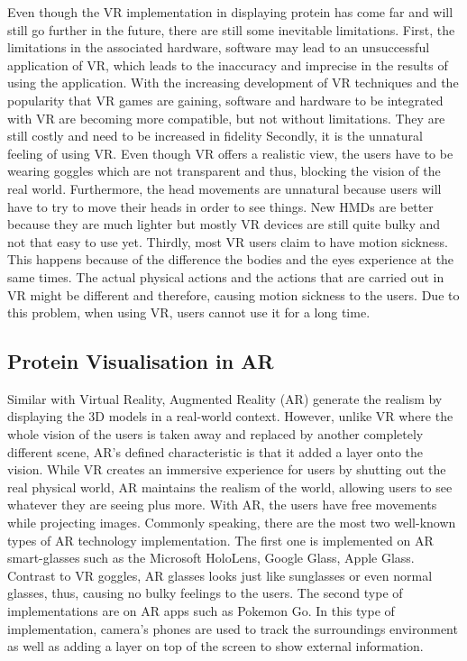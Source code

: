 Even though the VR implementation in displaying protein has come far and will still go further in the future, there are still some inevitable limitations. 
First, the limitations in the associated hardware, software may lead to an unsuccessful application of VR, which leads to the inaccuracy and imprecise in the results of using the application. With the increasing development of VR techniques and the popularity that VR games are gaining, software and hardware to be integrated with VR are becoming more compatible, but not without limitations. They are still costly and need to be increased in fidelity \parencite{liu_using_2018}
Secondly, it is the unnatural feeling of using VR. Even though VR offers a realistic view, the users have to be wearing goggles which are not transparent and thus, blocking the vision of the real world. Furthermore, the head movements are unnatural because users will have to try to move their heads in order to see things. New HMDs are better because they are much lighter but mostly VR devices are still quite bulky and not that easy to use yet. 
Thirdly, most VR users claim to have motion sickness. This happens because of the difference the bodies and the eyes experience at the same times. The actual physical actions and the actions that are carried out in VR might be different and therefore, causing motion sickness to the users. Due to this problem, when using VR, users cannot use it for a long time. 


\subsection{Protein Visualisation in AR}

Similar with Virtual Reality, Augmented Reality (AR) generate the realism by displaying the 3D models in a real-world context. However, unlike VR where the whole vision of the users is taken away and replaced by another completely different scene, AR’s defined characteristic is that it added a layer onto the vision. While VR creates an immersive experience for users by shutting out the real physical world, AR maintains the realism of the world, allowing users to see whatever they are seeing plus more. With AR, the users have free movements while projecting images. Commonly speaking, there are the most two well-known types of AR technology implementation. The first one is implemented on AR smart-glasses such as the Microsoft HoloLens, Google Glass, Apple Glass. Contrast to VR goggles, AR glasses looks just like sunglasses or even normal glasses, thus, causing no bulky feelings to the users. 
The second type of implementations are on AR apps such as Pokemon Go. In this type of implementation, camera’s phones are used to track the surroundings environment as well as adding a layer on top of the screen to show external information.

